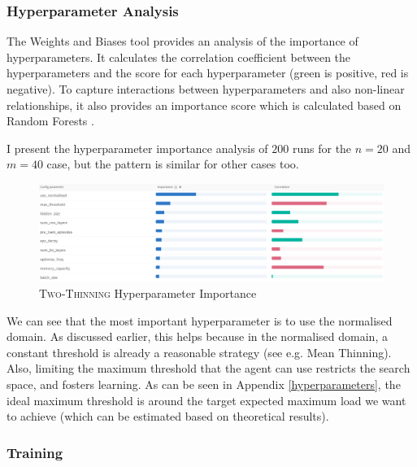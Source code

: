 \subsubsection{Hyperparameter Analysis}



The Weights and Biases tool provides an analysis of the importance of hyperparameters. It calculates the correlation coefficient between the hyperparameters and the score for each hyperparameter (green is positive, red is negative). To capture interactions between hyperparameters and also non-linear relationships, it also provides an importance score which is calculated based on Random Forests \cite{biewald2020wandb}.


I present the hyperparameter importance analysis of $200$ runs for the $n=20$ and $m=40$ case, but the pattern is similar for other cases too.


\begin{figure}[h!] \label{two-thinning-hyperparameter-importance}
    \centering
    \includegraphics[scale=0.4]{Chapter4/Figs/Hyperparameter_importance_20_400.png}
    \caption{\textsc{Two-Thinning} Hyperparameter Importance}
\end{figure}


We can see that the most important hyperparameter is to use the normalised domain. As discussed earlier, this helps because in the normalised domain, a constant threshold is already a reasonable strategy (see e.g. Mean Thinning). Also, limiting the maximum threshold that the agent can use restricts the search space, and fosters learning. As can be seen in Appendix \ref{hyperparameters}, the ideal maximum threshold is around the target expected maximum load we want to achieve (which can be estimated based on theoretical results).



\subsubsection{Training}


